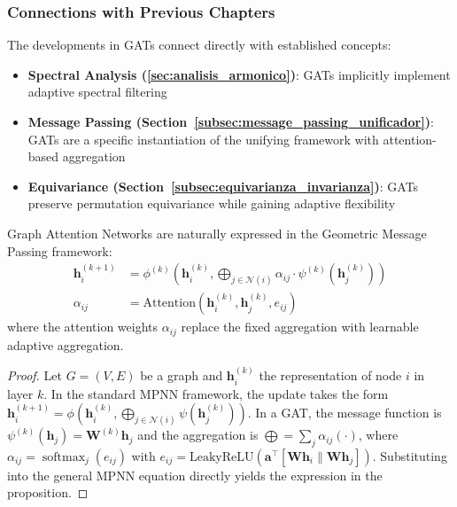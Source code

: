 \subsubsection{Connections with Previous Chapters}

The developments in GATs connect directly with established concepts:

\begin{itemize}
    \item \textbf{Spectral Analysis (\autoref{sec:analisis_armonico})}: GATs implicitly implement adaptive spectral filtering
    \item \textbf{Message Passing (Section~\ref{subsec:message_passing_unificador})}: GATs are a specific instantiation of the unifying framework with attention-based aggregation
    \item \textbf{Equivariance (Section~\ref{subsec:equivarianza_invarianza})}: GATs preserve permutation equivariance while gaining adaptive flexibility
\end{itemize}

\begin{proposition}\label{prop:gat_unified_framework}
Graph Attention Networks are naturally expressed in the Geometric Message Passing framework:
\begin{align}
    \mathbf{h}_i^{(k+1)} &= \phi^{(k)}\left(\mathbf{h}_i^{(k)}, \bigoplus_{j \in \mathcal{N}(i)} \alpha_{ij} \cdot \psi^{(k)}(\mathbf{h}_j^{(k)})\right) \\
    \alpha_{ij} &= \text{Attention}(\mathbf{h}_i^{(k)}, \mathbf{h}_j^{(k)}, e_{ij})
    \label{eq:gat_in_unified_framework}
\end{align}
where the attention weights $\alpha_{ij}$ replace the fixed aggregation with learnable adaptive aggregation.
\end{proposition}

\begin{proof}
Let $G = (V, E)$ be a graph and $\mathbf{h}_i^{(k)}$ the representation of node $i$ in layer $k$. In the standard MPNN framework, the update takes the form $\mathbf{h}_i^{(k+1)} = \phi(\mathbf{h}_i^{(k)}, \bigoplus_{j \in \mathcal{N}(i)} \psi(\mathbf{h}_j^{(k)}))$. In a GAT, the message function is $\psi^{(k)}(\mathbf{h}_j) = \mathbf{W}^{(k)} \mathbf{h}_j$ and the aggregation is $\bigoplus = \sum_{j} \alpha_{ij} (\cdot)$, where $\alpha_{ij} = \operatorname{softmax}_j(e_{ij})$ with $e_{ij} = \text{LeakyReLU}(\mathbf{a}^\top [\mathbf{W}\mathbf{h}_i \| \mathbf{W}\mathbf{h}_j])$. Substituting into the general MPNN equation directly yields the expression in the proposition.
\end{proof}

